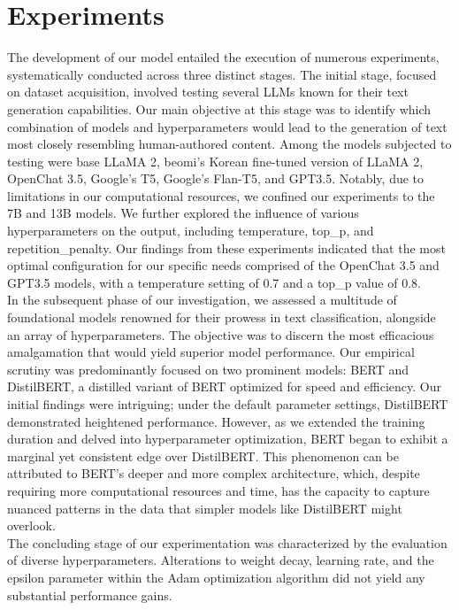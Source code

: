 \documentclass{article}
\begin{document}
\section{Experiments}
\null\quad The development of our model entailed the execution of numerous experiments, systematically conducted across three distinct stages.
The initial stage, focused on dataset acquisition, involved testing several LLMs known for their text generation capabilities.
Our main objective at this stage was to identify which combination of models and hyperparameters would lead to the generation of text most closely resembling human-authored content.
Among the models subjected to testing were base LLaMA 2, beomi's Korean fine-tuned version of LLaMA 2, OpenChat 3.5, Google's T5, Google's Flan-T5, and GPT3.5.
Notably, due to limitations in our computational resources, we confined our experiments to the 7B and 13B models.
We further explored the influence of various hyperparameters on the output, including temperature, top\_p, and repetition\_penalty.
Our findings from these experiments indicated that the most optimal configuration for our specific needs comprised of the OpenChat 3.5 and GPT3.5 models, with a temperature setting of 0.7 and a top\_p value of 0.8. \\
\null\quad In the subsequent phase of our investigation, we assessed a multitude of foundational models renowned for their prowess in text classification, alongside an array of hyperparameters.
The objective was to discern the most efficacious amalgamation that would yield superior model performance.
Our empirical scrutiny was predominantly focused on two prominent models: BERT and DistilBERT, a distilled variant of BERT optimized for speed and efficiency.
Our initial findings were intriguing; under the default parameter settings, DistilBERT demonstrated heightened performance.
However, as we extended the training duration and delved into hyperparameter optimization, BERT began to exhibit a marginal yet consistent edge over DistilBERT.
This phenomenon can be attributed to BERT's deeper and more complex architecture, which, despite requiring more computational resources and time,
has the capacity to capture nuanced patterns in the data that simpler models like DistilBERT might overlook. \\
\null\quad The concluding stage of our experimentation was characterized by the evaluation of diverse hyperparameters.
Alterations to weight decay, learning rate, and the epsilon parameter within the Adam optimization algorithm did not yield any substantial performance gains.
\end{document}

